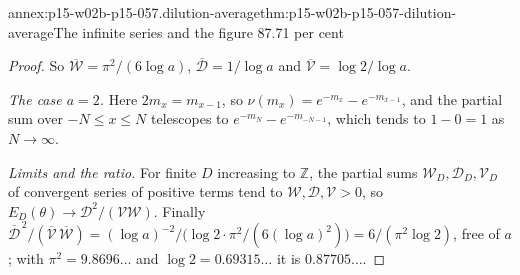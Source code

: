 \begin{annexitem}{annex:p15-w02b-p15-057.dilution-average}{thm:p15-w02b-p15-057-dilution-average}{The infinite series and the figure 87.71 per cent}
\begin{proof}
So \(\overline{\mathcal W}=\pi^2/(6\log a)\),
\(\overline{\mathcal D}=1/\log a\) and \(\overline{\mathcal V}=\log2/\log a\).

\emph{The case \(a=2\).} Here \(2m_x=m_{x-1}\), so
\(\nu(m_x)=e^{-m_x}-e^{-m_{x-1}}\), and the partial sum over
\(-N\leq x\leq N\) telescopes to \(e^{-m_N}-e^{-m_{-N-1}}\), which tends
to \(1-0=1\) as \(N\to\infty\).

\emph{Limits and the ratio.} For finite \(D\) increasing to \(\mathbb Z\),
the partial sums \(\mathcal W_D,\mathcal D_D,\mathcal V_D\) of convergent
series of positive terms tend to \(\mathcal W,\mathcal D,\mathcal V>0\), so
\(E_D(\theta)\to\mathcal D^2/(\mathcal V\mathcal W)\). Finally
\(\overline{\mathcal D}^{\,2}/(\overline{\mathcal V}\,\overline{\mathcal W})
=(\log a)^{-2}\big/\bigl(\log2\cdot\pi^2/(6(\log a)^2)\bigr)
=6/(\pi^2\log2)\), free of \(a\); with \(\pi^2=9.8696\ldots\) and
\(\log2=0.69315\ldots\) it is \(0.87705\ldots\).
\end{proof}
\end{annexitem}

